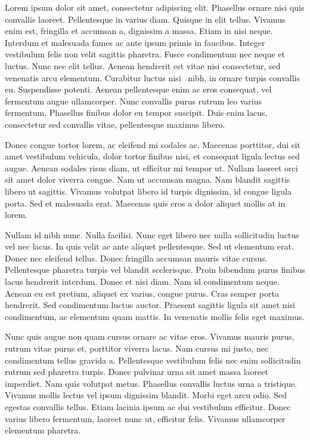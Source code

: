 Lorem ipsum dolor sit amet, consectetur adipiscing elit. Phasellus ornare nisi quis convallis laoreet. Pellentesque in varius diam. Quisque in elit tellus. Vivamus enim est, fringilla et accumsan a, dignissim a massa. Etiam in nisi neque. Interdum et malesuada fames ac ante ipsum primis in faucibus. Integer vestibulum felis non velit sagittis pharetra. Fusce condimentum nec neque et luctus. Nunc nec elit tellus. Aenean hendrerit est vitae nisi consectetur, sed venenatis arcu elementum. Curabitur luctus nisi~\cite{article} nibh, in ornare turpis convallis eu. Suspendisse potenti. Aenean pellentesque enim ac eros consequat, vel fermentum augue ullamcorper. Nunc convallis purus rutrum leo varius fermentum. Phasellus finibus dolor eu tempor suscipit. Duis enim lacus, consectetur sed convallis vitae, pellentesque maximus libero.

Donec congue tortor lorem, ac eleifend mi sodales ac. Maecenas porttitor, dui sit amet vestibulum vehicula, dolor tortor finibus nisi, et consequat ligula lectus sed augue. Aenean sodales risus diam, ut efficitur mi tempor ut. Nullam laoreet orci sit amet dolor viverra congue. Nam ut accumsan magna. Nam blandit sagittis libero ut sagittis. Vivamus volutpat libero id turpis dignissim, id congue ligula porta. Sed et malesuada erat. Maecenas quis eros a dolor aliquet mollis at in lorem.

Nullam id nibh nunc. Nulla facilisi. Nunc eget libero nec nulla sollicitudin luctus vel nec lacus. In quis velit ac ante aliquet pellentesque. Sed ut elementum erat. Donec nec eleifend tellus. Donec fringilla accumsan mauris vitae cursus. Pellentesque pharetra turpis vel blandit scelerisque. Proin bibendum purus finibus lacus hendrerit interdum. Donec et nisi diam. Nam id condimentum neque. Aenean eu est pretium, aliquet ex varius, congue purus. Cras semper porta hendrerit. Sed condimentum luctus auctor. Praesent sagittis ligula sit amet nisi condimentum, ac elementum quam mattis. In venenatis mollis felis eget maximus.

Nunc quis augue non quam cursus ornare ac vitae eros. Vivamus mauris purus, rutrum vitae purus et, porttitor viverra lacus. Nam cursus mi justo, nec condimentum tellus gravida a. Pellentesque vestibulum felis nec enim sollicitudin rutrum sed pharetra turpis. Donec pulvinar urna sit amet massa laoreet imperdiet. Nam quis volutpat metus. Phasellus convallis luctus urna a tristique. Vivamus mollis lectus vel ipsum dignissim blandit. Morbi eget arcu odio. Sed egestas convallis tellus. Etiam lacinia ipsum ac dui vestibulum efficitur. Donec varius libero fermentum, laoreet nunc ut, efficitur felis. Vivamus ullamcorper elementum pharetra.
